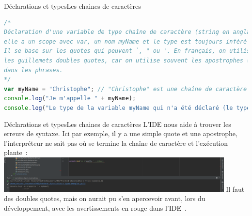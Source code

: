 \documentclass{beamer}
\begin{document}
    \begin{frame}[fragile]{Déclarations et types}{Les chaines de caractères}
        \begin{lstlisting}[language=JavaScript,title={\tiny{Script JavaScript}}]
/*
Déclaration d'une variable de type chaîne de caractère (string en anglais),
elle a un scope avec var, un nom myName et le type est toujours inféré par le langage.
Il se base sur les quotes qui peuvent `, " ou '. En français, on utilise souvent
les guillemets doubles quotes, car on utilise souvent les apostrophes (simple quote)
dans les phrases.
*/
var myName = "Christophe"; // "Christophe" est une chaîne de caractère (string en anglais)
console.log("Je m'appelle " + myName);
console.log("Le type de la variable myName qui n'a été déclaré (le type) est " + typeof myName);
        \end{lstlisting}
    \end{frame}

    \begin{frame}{Déclarations et types}{Les chaines de caractères}
        L'IDE nous aide à trouver les erreurs de syntaxe.
        \bigbreak
        Ici par exemple, il y a une simple quote et une apostrophe, l'interpréteur ne sait pas où se termine la chaîne de caractère et l'exécution plante~:
        \bigbreak
        \centering
        \includegraphics[width=12cm]{image/wrong-quote}
        \pause
        \bigbreak
        \flushleft
        Il faut des doubles quotes, mais on aurait pu s'en apercevoir avant, lors du développement, avec les avertissements en rouge dans l'IDE~.
    \end{frame}
\end{document}
